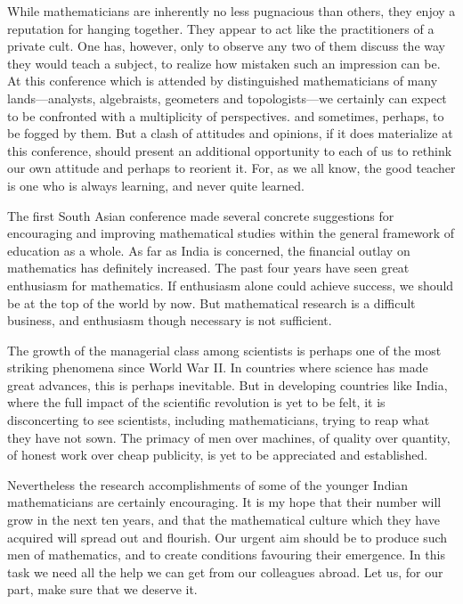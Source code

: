 While mathematicians are inherently no less pugnacious than others,
they enjoy a reputation for hanging together. They appear to act like
the practitioners of a private cult. One has, however, only to observe
any two of them discuss the way they would teach a subject, to realize
how mistaken such an impression can be. At this conference which is
attended by distinguished mathematicians of many lands---analysts,
algebraists, geometers and topologists---we certainly can expect to be
confronted with a multiplicity of perspectives. and sometimes,
perhaps, to be fogged by them. But a clash of attitudes and opinions,
if it does materialize at this conference, should present an
additional opportunity to each of us to rethink our own attitude and
perhaps to reorient it. For, as we all know, the good teacher is one
who is always learning, and never quite learned.

The first South Asian conference made several concrete suggestions for
encouraging and improving mathematical studies within the general
framework of education as a whole. As far as India is concerned, the
financial outlay on mathematics has definitely increased. The past
four years have seen great enthusiasm for mathematics. If enthusiasm
alone could achieve success, we should be at the top of the world by
now. But mathematical research is a difficult business, and enthusiasm
though necessary is not sufficient.

The growth of the managerial class among scientists is perhaps one of
the most striking phenomena since World War II. In countries where
science has made great advances, this is perhaps inevitable. But in
developing countries like India, where the full impact of the
scientific revolution is yet to be felt, it is disconcerting to see
scientists, including mathematicians, trying to reap what they have
not sown. The primacy of men over machines, of quality over quantity,\pageoriginale
of honest work over cheap publicity, is yet to be appreciated and established.

Nevertheless the research accomplishments of some of the younger
Indian mathematicians are certainly encouraging. It is my hope that
their number will grow in the next ten years, and that the
mathematical culture which they have acquired will spread out and
flourish. Our urgent aim should be to produce such men of mathematics,
and to create conditions favouring their emergence. In this task we
need all the help we can get from our colleagues abroad. Let us, for
our part, make sure that we deserve it.

